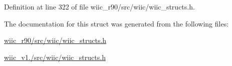 Definition at line 322 of file wiic\-\_\-r90/src/wiic/wiic\-\_\-structs.\-h.



The documentation for this struct was generated from the following files\-:\begin{DoxyCompactItemize}
\item 
\hyperlink{wiic__r90_2src_2wiic_2wiic__structs_8h}{wiic\-\_\-r90/src/wiic/wiic\-\_\-structs.\-h}\item 
\hyperlink{wiic__v1_81_2src_2wiic_2wiic__structs_8h}{wiic\-\_\-v1./src/wiic/wiic\-\_\-structs.\-h}\end{DoxyCompactItemize}
